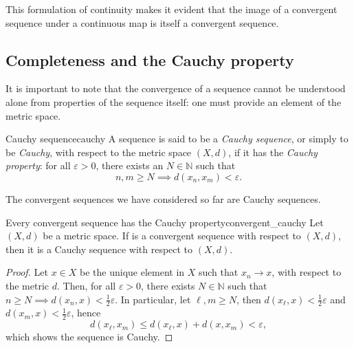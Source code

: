 \begin{remark}
    This formulation of continuity makes it evident that the image of a convergent sequence under a continuous map is itself a convergent sequence.
\end{remark}

\subsection{Completeness and the Cauchy property}
It is important to note that the convergence of a sequence cannot be understood alone from properties of the sequence itself: one must provide an element of the metric space.
\begin{definition}{Cauchy sequence}{cauchy}
    A sequence  is said to be a \emph{Cauchy sequence}, or simply to be \emph{Cauchy}, with respect to the metric space \((X, d)\), if it has the \emph{Cauchy property}: for all \(\varepsilon > 0\), there exists an \(N \in \mathbb{N}\) such that
    \begin{equation*}
        n,m \geq N \implies d(x_n, x_m) < \varepsilon.
    \end{equation*}
\end{definition}

The convergent sequences we have considered so far are Cauchy sequences.
\begin{proposition}{Every convergent sequence has the Cauchy property}{convergent_cauchy}
    Let \((X, d)\) be a metric space. If  is a convergent sequence with respect to \((X, d)\), then it is a Cauchy sequence with respect to \((X, d)\).
\end{proposition}
\begin{proof}
    Let \(x \in X\) be the unique element in \(X\) such that \(x_n \to x\), with respect to the metric \(d\). Then, for all \(\varepsilon > 0\), there exists \(N \in \mathbb{N}\) such that \(n \geq N \implies d(x_n, x) < \frac12\varepsilon.\) In particular, let \(\ell, m \geq N\), then \(d(x_\ell, x) < \frac12 \varepsilon\) and \(d(x_m, x) < \frac12 \varepsilon\), hence
    \begin{equation*}
        d(x_\ell, x_m) \leq d(x_\ell, x) + d(x, x_m) < \varepsilon,
    \end{equation*}
    which shows the sequence is Cauchy.
\end{proof}

